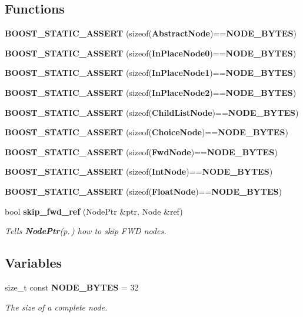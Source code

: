 \subsection*{Functions}
\begin{CompactItemize}
\item 
{\bf BOOST\_\-STATIC\_\-ASSERT} (sizeof({\bf Abstract\-Node})=={\bf NODE\_\-BYTES})\label{namespacesprite_a57}

\item 
{\bf BOOST\_\-STATIC\_\-ASSERT} (sizeof({\bf In\-Place\-Node0})=={\bf NODE\_\-BYTES})\label{namespacesprite_a58}

\item 
{\bf BOOST\_\-STATIC\_\-ASSERT} (sizeof({\bf In\-Place\-Node1})=={\bf NODE\_\-BYTES})\label{namespacesprite_a59}

\item 
{\bf BOOST\_\-STATIC\_\-ASSERT} (sizeof({\bf In\-Place\-Node2})=={\bf NODE\_\-BYTES})\label{namespacesprite_a60}

\item 
{\bf BOOST\_\-STATIC\_\-ASSERT} (sizeof({\bf Child\-List\-Node})=={\bf NODE\_\-BYTES})\label{namespacesprite_a61}

\item 
{\bf BOOST\_\-STATIC\_\-ASSERT} (sizeof({\bf Choice\-Node})=={\bf NODE\_\-BYTES})\label{namespacesprite_a62}

\item 
{\bf BOOST\_\-STATIC\_\-ASSERT} (sizeof({\bf Fwd\-Node})=={\bf NODE\_\-BYTES})\label{namespacesprite_a63}

\item 
{\bf BOOST\_\-STATIC\_\-ASSERT} (sizeof({\bf Int\-Node})=={\bf NODE\_\-BYTES})\label{namespacesprite_a64}

\item 
{\bf BOOST\_\-STATIC\_\-ASSERT} (sizeof({\bf Float\-Node})=={\bf NODE\_\-BYTES})\label{namespacesprite_a65}

\item 
bool {\bf skip\_\-fwd\_\-ref} (Node\-Ptr \&ptr, Node \&ref)\label{namespacesprite_a66}

\begin{CompactList}\small\item\em Tells {\bf Node\-Ptr}{\rm (p.\,\pageref{structsprite_1_1NodePtr})} how to skip FWD nodes. \item\end{CompactList}\end{CompactItemize}
\subsection*{Variables}
\begin{CompactItemize}
\item 
size\_\-t const {\bf NODE\_\-BYTES} = 32
\begin{CompactList}\small\item\em The size of a complete node. \item\end{CompactList}\end{CompactItemize}


